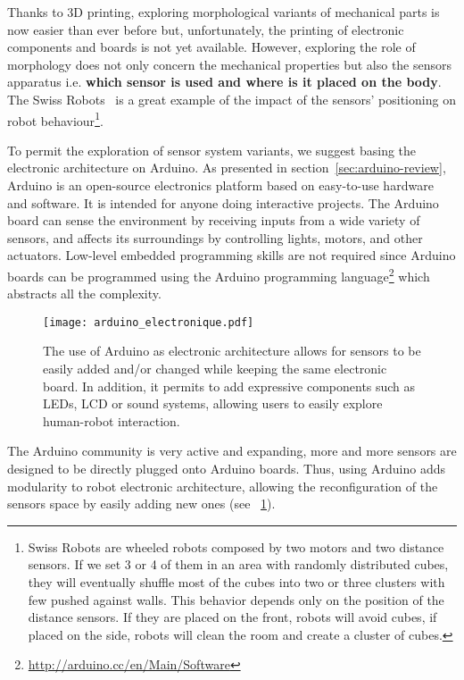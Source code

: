 Thanks to 3D printing, exploring morphological variants of mechanical parts is now easier than ever before but, unfortunately, the printing of electronic components and boards is not yet available. However, exploring the role of morphology does not only concern the mechanical properties but also the sensors apparatus i.e. \textbf{which sensor is used and where is it placed on the body}. The Swiss Robots~\parencite{maris1996exploiting} is a great example of the impact of the sensors’ positioning on robot behaviour\footnote{Swiss Robots are wheeled robots composed by two motors and two distance sensors. If we set 3 or 4 of them in an area with randomly distributed cubes, they will eventually shuffle most of the cubes into two or three clusters with few pushed against walls. This behavior depends only on the position of the distance sensors. If they are placed on the front, robots will avoid cubes, if placed on the side, robots will clean the room and create a cluster of cubes.}.

To permit the exploration of sensor system variants, we suggest basing the electronic architecture on Arduino. As presented in section~\ref{sec:arduino-review}, Arduino is an open-source electronics platform based on easy-to-use hardware and software. It is intended for anyone doing interactive projects. The Arduino board can sense the environment by receiving inputs from a wide variety of sensors, and affects its surroundings by controlling lights, motors, and other actuators. Low-level embedded programming skills are not required since Arduino boards can be programmed using the Arduino programming language\footnote{\url{http://arduino.cc/en/Main/Software}} which abstracts all the complexity.

\begin{figure}[tb]
    \begin{center}
        \texttt{[image: arduino\_electronique.pdf]}
    \end{center}
    \caption{The use of Arduino as electronic architecture  allows for sensors to be easily added and/or changed while keeping the same electronic board. In addition, it permits to add expressive components such as LEDs, LCD or sound systems, allowing users to easily explore human-robot interaction.}
    \label{fig:arduino_modular_electronic}
\end{figure}


The Arduino community is very active and expanding, more and more sensors are designed to be directly plugged onto Arduino boards. Thus, using Arduino adds modularity to robot electronic architecture, allowing the reconfiguration of the sensors space by easily adding new ones (see \figurename~\ref{fig:arduino_modular_electronic}).


